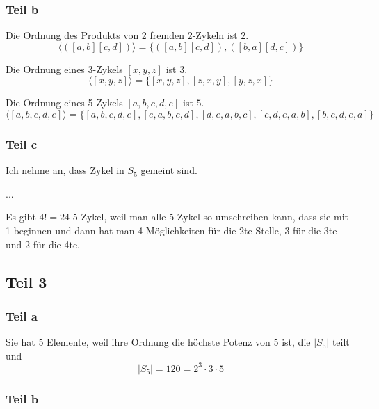 \documentclass[10pt,a4paper]{article}
\begin{document}
\subsubsection{Teil b}

Die Ordnung des Produkts von 2 fremden 2-Zykeln ist $2$.
\begin{equation}
  \langle ([a, b][c, d]) \rangle = \{ ([a, b][c, d]), ([b, a][d, c]) \}
\end{equation}

Die Ordnung eines 3-Zykels $[x, y, z]$ ist $3$.
\begin{equation}
  \langle [x, y, z] \rangle = \{ [x, y, z], [z, x, y], [y, z, x] \}
\end{equation}

Die Ordnung eines 5-Zykels $[a, b, c, d, e]$ ist $5$.
\begin{equation}
  \langle [a, b, c, d, e] \rangle = \{ [a, b, c, d, e], [e, a, b, c, d], [d, e, a, b, c], [c, d, e, a, b], [b, c, d, e, a] \}
\end{equation}

\subsubsection{Teil c}

Ich nehme an, dass Zykel in $S_{5}$ gemeint sind.

...

Es gibt $4! = 24$ 5-Zykel, weil man alle 5-Zykel so umschreiben kann, dass sie mit 1 beginnen und dann hat man 4 Möglichkeiten für die 2te Stelle, 3 für die 3te und 2 für die 4te.

\subsection{Teil 3}

\subsubsection{Teil a}

Sie hat $5$ Elemente, weil ihre Ordnung die höchste Potenz von $5$ ist, die $|S_{5}|$ teilt und
\begin{equation}
  |S_{5}| = 120 = 2^{3} \cdot 3 \cdot 5
\end{equation}

\subsubsection{Teil b}
\end{document}
